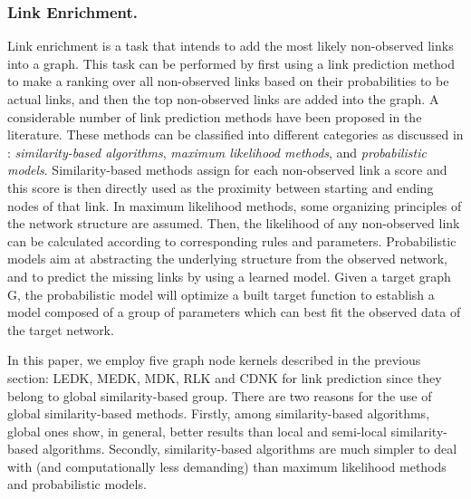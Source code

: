 \subsubsection{Link Enrichment.}
\label{link-enrichment}
Link enrichment is a task that intends to add the most likely non-observed links into a graph. This task can be performed by first using a link prediction method to make a ranking over all non-observed links based on their probabilities to be actual links, and then the top non-observed links are added into the graph. A considerable number of link prediction methods have been proposed in the literature. These methods can be classified into different categories as discussed in \cite{jour2}: \textit{similarity-based algorithms}, \textit{maximum likelihood methods}, and \textit{probabilistic models}. Similarity-based methods assign for each non-observed link a score and this score is then directly used as the proximity between starting and ending nodes of that link. In maximum likelihood methods, some organizing principles of the network structure are assumed. Then, the likelihood of any non-observed link can be calculated according to corresponding rules and parameters. Probabilistic models aim at abstracting the underlying structure from the observed network, and to predict the missing links by using a learned model. Given a target graph G, the probabilistic model will optimize a built target function to establish a model composed of a group of parameters which can best fit the observed data of the target network.

In this paper, we employ five graph node kernels described in the previous section: LEDK, MEDK, MDK, RLK and CDNK for link prediction since they belong to global similarity-based group. There are two reasons for the use of global similarity-based methods. Firstly, among similarity-based algorithms, global ones show, in general, better results   than local and semi-local similarity-based algorithms. Secondly, similarity-based algorithms are much simpler to deal with (and computationally less demanding) than maximum likelihood methods and probabilistic models.
